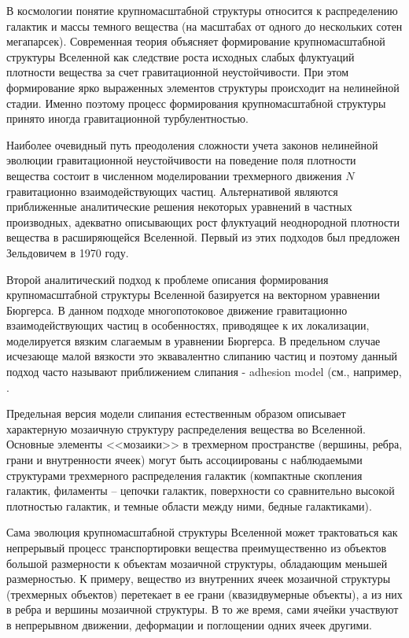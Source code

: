 В космологии понятие крупномасштабной структуры относится к распределению галактик и массы темного вещества (на масштабах от одного до нескольких сотен мегапарсек). Современная теория объясняет формирование крупномасштабной структуры Вселенной как следствие роста исходных слабых флуктуаций плотности вещества за счет гравитационной неустойчивости. При этом формирование ярко выраженных элементов структуры происходит на нелинейной стадии. Именно поэтому процесс формирования крупномасштабной структуры принято иногда гравитационной турбулентностью.

Наиболее очевидный путь преодоления сложности учета законов нелинейной эволюции гравитационной неустойчивости на поведение поля плотности вещества состоит в численном моделировании трехмерного движения $N$ гравитационно взаимодействующих частиц. Альтернативой являются приближенные аналитические решения некоторых уравнений в частных производных, адекватно описывающих рост флуктуаций неоднородной плотности вещества в расширяющейся Вселенной. Первый из этих подходов был предложен Зельдовичем в 1970 году.

Второй аналитический подход к проблеме описания формирования крупномасштабной структуры Вселенной \cite{a1} базируется на векторном уравнении Бюргерса. В данном подходе многопотоковое движение гравитационно взаимодействующих частиц в особенностях, приводящее к их локализации, моделируется вязким слагаемым в уравнении Бюргерса. В предельном случае исчезающе малой вязкости это эквавалентно слипанию частиц и поэтому данный подход часто называют приближением слипания - adhesion model (см., например, \cite{a2,a3,a4,a5}. 

Предельная версия модели слипания естественным образом описывает характерную мозаичную структуру распределения вещества во Вселенной. Основные элементы <<мозаики>> в трехмерном пространстве (вершины, ребра, грани и внутренности ячеек) могут быть ассоциированы с наблюдаемыми структурами трехмерного распределения галактик (компактные скопления галактик, филаменты -- цепочки галактик, поверхности со сравнительно высокой плотностью галактик, и темные области между ними, бедные галактиками).

Сама эволюция крупномасштабной структуры Вселенной может трактоваться как непрерывый процесс транспортировки вещества преимущественно из объектов большой размерности к объектам мозаичной структуры, обладающим меньшей размерностью. К примеру, вещество из внутренних ячеек мозаичной структуры (трехмерных объектов) перетекает в ее грани (квазидвумерные объекты), а из них в ребра и вершины мозаичной структуры. В то же время, сами ячейки участвуют в непрерывном движении, деформации и поглощении одних ячеек другими.

